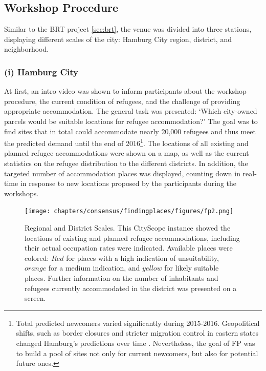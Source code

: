 {    \subsection{Workshop Procedure}
    {
        Similar to the BRT project \eqref{sec:brt}, the venue was divided into three stations, displaying different scales of the city: Hamburg City region, district, and neighborhood.

        \subsubsection{(i) Hamburg City}
        {
            At first, an intro video was shown to inform participants about the workshop procedure, the current condition of refugees, and the challenge of providing appropriate accommodation. The general task was presented: `Which city-owned parcels would be suitable locations for refugee accommodation?' The goal was to find sites that in total could accommodate nearly 20,000 refugees and thus meet the predicted demand until the end of 2016\footnote{Total predicted newcomers varied significantly during 2015-2016. Geopolitical shifts, such as border closures and stricter migration control in eastern states changed Hamburg's predictions over time \cite{katz2016cities}. Nevertheless, the goal of FP was to build a pool of sites not only for current newcomers, but also for potential future ones.}. The locations of all existing and planned refugee accommodations were shown on a map, as well as the current statistics on the refugee distribution to the different districts. In addition, the targeted number of accommodation places was displayed, counting down in real-time in response to new locations proposed by the participants during the workshops.
        }

        \begin{figure}[!htb]
            \begin{center}
                \texttt{[image: chapters/consensus/findingplaces/figures/fp2.png]}
            \end{center}
            \caption{
                Regional and District Scales. This CityScope instance showed the locations of existing and planned refugee accommodations, including their actual occupation rates were indicated. Available places were colored: $Red$ for places with a high indication of unsuitability, $orange$ for a medium indication, and $yellow$ for likely suitable places. Further information on the number of inhabitants and refugees currently accommodated in the district was presented on a screen.
            }
            \label{fig:fp_city_scale}
        \end{figure}


}}
